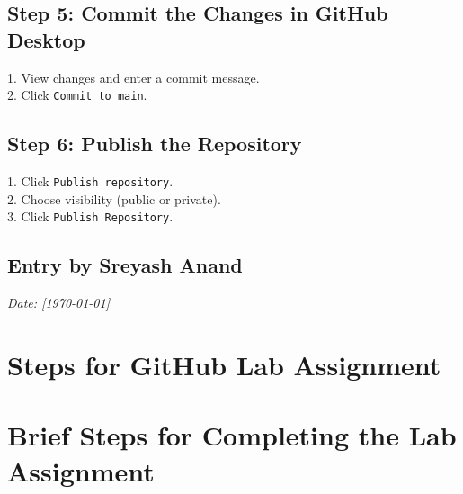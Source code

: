 \documentclass[a4paper,12pt]{article}
\begin{document}
\subsection*{Step 5: Commit the Changes in GitHub Desktop}
1. View changes and enter a commit message.\\
2. Click \texttt{Commit to main}.

\subsection*{Step 6: Publish the Repository}
1. Click \texttt{Publish repository}.\\
2. Choose visibility (public or private).\\
3. Click \texttt{Publish Repository}.

\subsection*{Entry by Sreyash Anand}
\textit{Date: [\today]}\\


\section{Steps for GitHub Lab Assignment}

\section*{Brief Steps for Completing the Lab Assignment}
\end{document}
